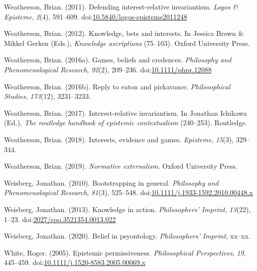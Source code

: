 \documentclass[
  10pt,
  letterpaper,
  twoside]{scrbook}
\newlength{\cslhangindent}
\newenvironment{CSLReferences}[2] %
 {\begin{list}{}{%
  \setlength{\itemindent}{0pt}
  \setlength{\leftmargin}{0pt}
  \setlength{\parsep}{0pt}
  \ifodd #1
   \setlength{\leftmargin}{\cslhangindent}
   \setlength{\itemindent}{-1\cslhangindent}
  \fi
  \setlength{\itemsep}{#2\baselineskip}}}
 {\end{list}}
\begin{document}
\begin{CSLReferences}{1}{0}
Weatherson, Brian. (2011). Defending interest-relative invariantism.
\emph{Logos \& Episteme}, \emph{2}(4), 591--609.
doi:\href{https://doi.org/10.5840/logos-episteme2011248}{10.5840/logos-episteme2011248}

Weatherson, Brian. (2012). Knowledge, bets and interests. In Jessica
Brown \& Mikkel Gerken (Eds.), \emph{Knowledge ascriptions} (75--103).
Oxford University Press.

Weatherson, Brian. (2016a). Games, beliefs and credences.
\emph{Philosophy and Phenomenological Research}, \emph{92}(2), 209--236.
doi:\href{https://doi.org/10.1111/phpr.12088}{10.1111/phpr.12088}

Weatherson, Brian. (2016b). Reply to eaton and pickavance.
\emph{Philosophical Studies}, \emph{173}(12), 3231--3233.

Weatherson, Brian. (2017). Interest-relative invariantism. In Jonathan
Ichikawa (Ed.), \emph{The routledge handbook of epistemic contextualism}
(240--253). Routledge.

Weatherson, Brian. (2018). Interests, evidence and games.
\emph{Episteme}, \emph{15}(3), 329--344.

Weatherson, Brian. (2019). \emph{Normative externalism}. Oxford
University Press.

Weisberg, Jonathan. (2010). Bootstrapping in general. \emph{Philosophy
and Phenomenological Research}, \emph{81}(3), 525--548.
doi:\href{https://doi.org/10.1111/j.1933-1592.2010.00448.x}{10.1111/j.1933-1592.2010.00448.x}

Weisberg, Jonathan. (2013). Knowledge in action. \emph{Philosophers'
Imprint}, \emph{13}(22), 1--23.
doi:\href{https://doi.org/2027/spo.3521354.0013.022}{2027/spo.3521354.0013.022}

Weisberg, Jonathan. (2020). Belief in psyontology. \emph{Philosophers'
Imprint}, xx--xx.

White, Roger. (2005). Epistemic permissiveness. \emph{Philosophical
Perspectives}, \emph{19}, 445--459.
doi:\href{https://doi.org/10.1111/j.1520-8583.2005.00069.x}{10.1111/j.1520-8583.2005.00069.x}


\end{CSLReferences}
\end{document}
